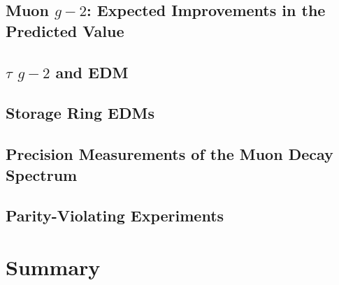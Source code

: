 \section{Muon $g-2$:  Expected Improvements in the Predicted Value}
\vskip -12pt


\section{$\tau$ $g-2$ and EDM}
\vskip -12pt


\section{Storage Ring EDMs}
\vskip -12pt


\section{Precision Measurements of the Muon Decay Spectrum}
\vskip -12pt


\section{Parity-Violating Experiments}\label{sec:cl:pve}
\vskip -12pt


\chapter{Summary}\label{sec:cl:gm2edmdisc}






